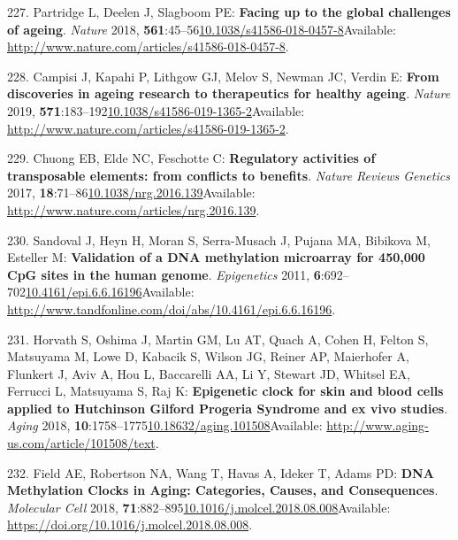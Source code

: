 \documentclass[
]{book}
\begin{document}
\leavevmode\hypertarget{ref-Partridge2018}{}%
227. Partridge L, Deelen J, Slagboom PE: \textbf{Facing up to the global challenges of ageing}. \emph{Nature} 2018, \textbf{561}:45--56\href{https://doi.org/10.1038/s41586-018-0457-8}{10.1038/s41586-018-0457-8}Available: \url{http://www.nature.com/articles/s41586-018-0457-8}.

\leavevmode\hypertarget{ref-Campisi2019}{}%
228. Campisi J, Kapahi P, Lithgow GJ, Melov S, Newman JC, Verdin E: \textbf{From discoveries in ageing research to therapeutics for healthy ageing}. \emph{Nature} 2019, \textbf{571}:183--192\href{https://doi.org/10.1038/s41586-019-1365-2}{10.1038/s41586-019-1365-2}Available: \url{http://www.nature.com/articles/s41586-019-1365-2}.

\leavevmode\hypertarget{ref-Chuong2017}{}%
229. Chuong EB, Elde NC, Feschotte C: \textbf{Regulatory activities of transposable elements: from conflicts to benefits}. \emph{Nature Reviews Genetics} 2017, \textbf{18}:71--86\href{https://doi.org/10.1038/nrg.2016.139}{10.1038/nrg.2016.139}Available: \url{http://www.nature.com/articles/nrg.2016.139}.

\leavevmode\hypertarget{ref-Sandoval2011}{}%
230. Sandoval J, Heyn H, Moran S, Serra-Musach J, Pujana MA, Bibikova M, Esteller M: \textbf{Validation of a DNA methylation microarray for 450,000 CpG sites in the human genome}. \emph{Epigenetics} 2011, \textbf{6}:692--702\href{https://doi.org/10.4161/epi.6.6.16196}{10.4161/epi.6.6.16196}Available: \url{http://www.tandfonline.com/doi/abs/10.4161/epi.6.6.16196}.

\leavevmode\hypertarget{ref-Horvath2018a}{}%
231. Horvath S, Oshima J, Martin GM, Lu AT, Quach A, Cohen H, Felton S, Matsuyama M, Lowe D, Kabacik S, Wilson JG, Reiner AP, Maierhofer A, Flunkert J, Aviv A, Hou L, Baccarelli AA, Li Y, Stewart JD, Whitsel EA, Ferrucci L, Matsuyama S, Raj K: \textbf{Epigenetic clock for skin and blood cells applied to Hutchinson Gilford Progeria Syndrome and ex vivo studies}. \emph{Aging} 2018, \textbf{10}:1758--1775\href{https://doi.org/10.18632/aging.101508}{10.18632/aging.101508}Available: \url{http://www.aging-us.com/article/101508/text}.

\leavevmode\hypertarget{ref-Field2018}{}%
232. Field AE, Robertson NA, Wang T, Havas A, Ideker T, Adams PD: \textbf{DNA Methylation Clocks in Aging: Categories, Causes, and Consequences}. \emph{Molecular Cell} 2018, \textbf{71}:882--895\href{https://doi.org/10.1016/j.molcel.2018.08.008}{10.1016/j.molcel.2018.08.008}Available: \url{https://doi.org/10.1016/j.molcel.2018.08.008}.
\end{document}
